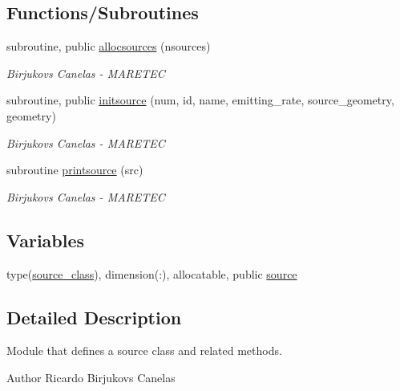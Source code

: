 \subsection*{Functions/\+Subroutines}
\begin{DoxyCompactItemize}
\item 
subroutine, public \mbox{\hyperlink{namespacesource__identity_a716b4cb4acec5756a6d4dcf20eee588e}{allocsources}} (nsources)
\begin{DoxyCompactList}\small\item\em Birjukovs Canelas -\/ M\+A\+R\+E\+T\+EC \end{DoxyCompactList}\item 
subroutine, public \mbox{\hyperlink{namespacesource__identity_a3939e59172252d0edce57e00ea41758d}{initsource}} (num, id, name, emitting\+\_\+rate, source\+\_\+geometry, geometry)
\begin{DoxyCompactList}\small\item\em Birjukovs Canelas -\/ M\+A\+R\+E\+T\+EC \end{DoxyCompactList}\item 
subroutine \mbox{\hyperlink{namespacesource__identity_ac4fc3a54de91016023a7948d261f84a5}{printsource}} (src)
\begin{DoxyCompactList}\small\item\em Birjukovs Canelas -\/ M\+A\+R\+E\+T\+EC \end{DoxyCompactList}\end{DoxyCompactItemize}
\subsection*{Variables}
\begin{DoxyCompactItemize}
\item 
type(\mbox{\hyperlink{structsource__identity_1_1source__class}{source\+\_\+class}}), dimension(\+:), allocatable, public \mbox{\hyperlink{namespacesource__identity_a5ed8006613af7461c6a2ff1cdaeb8f0f}{source}}
\end{DoxyCompactItemize}


\subsection{Detailed Description}
Module that defines a source class and related methods. 

\begin{DoxyAuthor}{Author}
Ricardo Birjukovs Canelas 
\end{DoxyAuthor}


